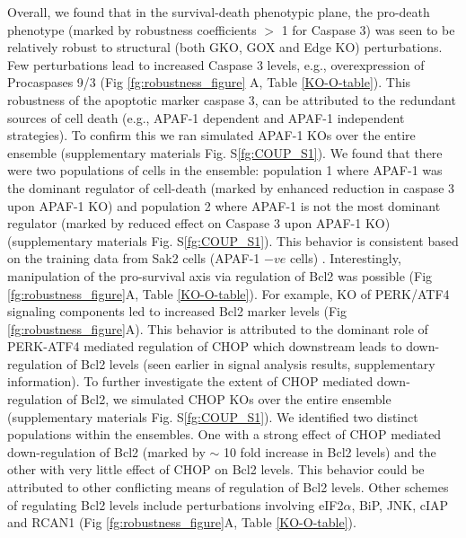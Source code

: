 \documentclass[fleqn,10pt]{wlscirep}
\begin{document}
Overall, we found that in the survival-death phenotypic plane, the pro-death phenotype (marked by robustness coefficients $>$ 1 for Caspase 3) was seen to be relatively robust to structural (both GKO, GOX and Edge KO) perturbations. Few perturbations lead to increased Caspase 3 levels, e.g., overexpression of Procaspases 9/3 (Fig \ref{fg:robustness_figure} A, Table \ref{KO-O-table}). This robustness of the apoptotic marker caspase 3, can be attributed to the redundant sources of cell death (e.g., APAF-1 dependent and APAF-1 independent strategies). To confirm this we ran simulated APAF-1 KOs over the entire ensemble (supplementary materials Fig. S\ref{fg:COUP_S1}). We found that there were two populations of cells in the ensemble: population 1 where APAF-1 was the dominant regulator of cell-death (marked by enhanced reduction in caspase 3 upon APAF-1 KO) and population 2 where APAF-1 is not the most dominant regulator (marked by reduced effect on Caspase 3 upon APAF-1 KO) (supplementary materials Fig. S\ref{fg:COUP_S1}). This behavior is consistent based on the training data from Sak2 cells (APAF-1 $-ve$ cells) \cite{rao2002cer}. Interestingly, manipulation of the pro-survival axis via regulation of Bcl2 was possible (Fig \ref{fg:robustness_figure}A, Table \ref{KO-O-table}). For example, KO of PERK/ATF4 signaling components led to increased Bcl2 marker levels (Fig \ref{fg:robustness_figure}A). This behavior is attributed to the dominant role of PERK-ATF4 mediated regulation of CHOP which downstream leads to down-regulation of Bcl2 levels (seen earlier in signal analysis results, supplementary information). To further investigate the extent of CHOP mediated down-regulation of Bcl2, we simulated CHOP KOs over the entire ensemble (supplementary materials Fig. S\ref{fg:COUP_S1}). We identified two distinct populations within the ensembles. One with a strong effect of CHOP mediated down-regulation of Bcl2 (marked by $\sim$ 10 fold increase in Bcl2 levels) and the other with very little effect of CHOP on Bcl2 levels. This behavior could be attributed to other conflicting means of regulation of Bcl2 levels. Other schemes of regulating Bcl2 levels include perturbations involving eIF2$\alpha$, BiP, JNK, cIAP and RCAN1 (Fig \ref{fg:robustness_figure}A, Table \ref{KO-O-table}). 
\end{document}
